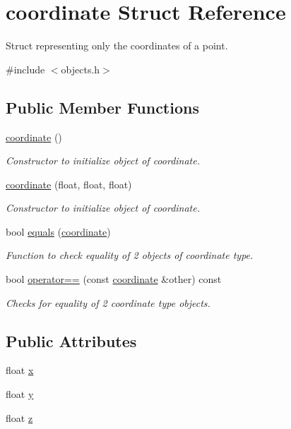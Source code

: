 \hypertarget{structcoordinate}{}\section{coordinate Struct Reference}
\label{structcoordinate}


Struct representing only the coordinates of a point.  




{\ttfamily \#include $<$objects.\+h$>$}

\subsection*{Public Member Functions}
\begin{DoxyCompactItemize}
\item 
\mbox{\hyperlink{structcoordinate_ad085d510d10555d6e6738ce5f53c8b2e}{coordinate}} ()
\begin{DoxyCompactList}\small\item\em Constructor to initialize object of coordinate. \end{DoxyCompactList}\item 
\mbox{\hyperlink{structcoordinate_ac7ea93bbde3bfce755ffb367aae222c3}{coordinate}} (float, float, float)
\begin{DoxyCompactList}\small\item\em Constructor to initialize object of coordinate. \end{DoxyCompactList}\item 
bool \mbox{\hyperlink{structcoordinate_a0fec3cedeb21f6cefc564449a409fc57}{equals}} (\mbox{\hyperlink{structcoordinate}{coordinate}})
\begin{DoxyCompactList}\small\item\em Function to check equality of 2 objects of coordinate type. \end{DoxyCompactList}\item 
bool \mbox{\hyperlink{structcoordinate_aa137ae8aeb3a4ceee25e595ae6a2428f}{operator==}} (const \mbox{\hyperlink{structcoordinate}{coordinate}} \&other) const
\begin{DoxyCompactList}\small\item\em Checks for equality of 2 coordinate type objects. \end{DoxyCompactList}\end{DoxyCompactItemize}
\subsection*{Public Attributes}
\begin{DoxyCompactItemize}
\item 
float \mbox{\hyperlink{structcoordinate_acde0819ef9d30b7ce25b7d833d3df327}{x}}
\item 
float \mbox{\hyperlink{structcoordinate_ad48911206c84b1a8306a7023900ff622}{y}}
\item 
float \mbox{\hyperlink{structcoordinate_adc6bd1c982cdec4d5e7d55b1f7e62374}{z}}
\end{DoxyCompactItemize}


